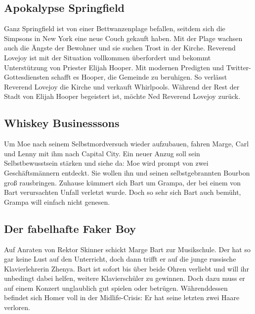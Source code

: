 \subsection{Apokalypse Springfield}\label{RABF11}
Ganz Springfield ist von einer Bettwanzenplage befallen, seitdem sich die Simpsons in New York eine neue Couch gekauft haben. Mit der Plage wachsen auch die Ängste der Bewohner und sie suchen Trost in der Kirche. Reverend Lovejoy ist mit der Situation vollkommen überfordert und bekommt Unterstützung von Priester Elijah Hooper. Mit modernen Predigten und Twitter-Gottesdiensten schafft es Hooper, die Gemeinde zu beruhigen. So verlässt Reverend Lovejoy die Kirche und verkauft Whirlpools. Während der Rest der Stadt von Elijah Hooper begeistert ist, möchte Ned Reverend Lovejoy zurück.


\subsection{Whiskey Businesssons}
Um Moe nach seinem Selbstmordversuch wieder aufzubauen, fahren Marge, Carl und Lenny mit ihm nach Capital City. Ein neuer Anzug soll sein Selbstbewusstsein stärken und siehe da: Moe wird prompt von zwei Geschäftsmännern entdeckt. Sie wollen ihn und seinen selbstgebrannten Bourbon groß rausbringen. Zuhause kümmert sich Bart um Grampa, der bei einem von Bart verursachten Unfall verletzt wurde. Doch so sehr sich Bart auch bemüht, Grampa will einfach nicht genesen.


\subsection{Der fabelhafte Faker Boy}
Auf Anraten von Rektor Skinner schickt Marge Bart zur Musikschule. Der hat so gar keine Lust auf den Unterricht, doch dann trifft er auf die junge russische Klavierlehrerin Zhenya. Bart ist sofort bis über beide Ohren verliebt und will ihr unbedingt dabei helfen, weitere Klavierschüler zu gewinnen. Doch dazu muss er auf einem Konzert unglaublich gut spielen oder betrügen. Währenddessen befindet sich Homer voll in der Midlife-Crisis: Er hat seine letzten zwei Haare verloren.


